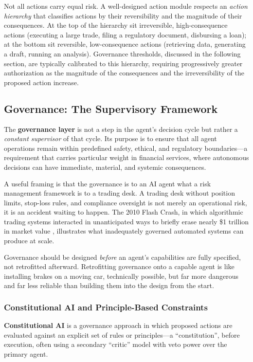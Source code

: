 \documentclass{article}
\begin{document}
Not all actions carry equal risk. A well-designed action module respects an \textit{action hierarchy} that classifies actions by their reversibility and the magnitude of their consequences. At the top of the hierarchy sit irreversible, high-consequence actions (executing a large trade, filing a regulatory document, disbursing a loan); at the bottom sit reversible, low-consequence actions (retrieving data, generating a draft, running an analysis). Governance thresholds, discussed in the following section, are typically calibrated to this hierarchy, requiring progressively greater authorization as the magnitude of the consequences and the irreversibility of the proposed action increase.

\subsection{Governance: The Supervisory Framework}
\label{subsec:governance}
The \textbf{governance layer} is not a step in the agent's decision cycle but rather a \textit{constant supervisor} of that cycle. Its purpose is to ensure that all agent operations remain within predefined safety, ethical, and regulatory boundaries—a requirement that carries particular weight in financial services, where autonomous decisions can have immediate, material, and systemic consequences.

A useful framing is that the governance is to an AI agent what a risk management framework is to a trading desk. A trading desk without position limits, stop-loss rules, and compliance oversight is not merely an operational risk, it is an accident waiting to happen. The 2010 Flash Crash, in which algorithmic trading systems interacted in unanticipated ways to briefly erase nearly \$1 trillion in market value \cite{kirilenko2017flash}, illustrates what inadequately governed automated systems can produce at scale.

Governance should be designed \textit{before} an agent's capabilities are fully specified, not retrofitted afterward. Retrofitting governance onto a capable agent is like installing brakes on a moving car, technically possible, but far more dangerous and far less reliable than building them into the design from the start.

\subsubsection{Constitutional AI and Principle-Based Constraints}
\label{governance}
\textbf{Constitutional AI} \cite{bai2022constitutional} is a governance approach in which proposed actions are evaluated against an explicit set of rules or principles—a ``constitution'', before execution, often using a secondary ``critic'' model with veto power over the primary agent.
\end{document}
